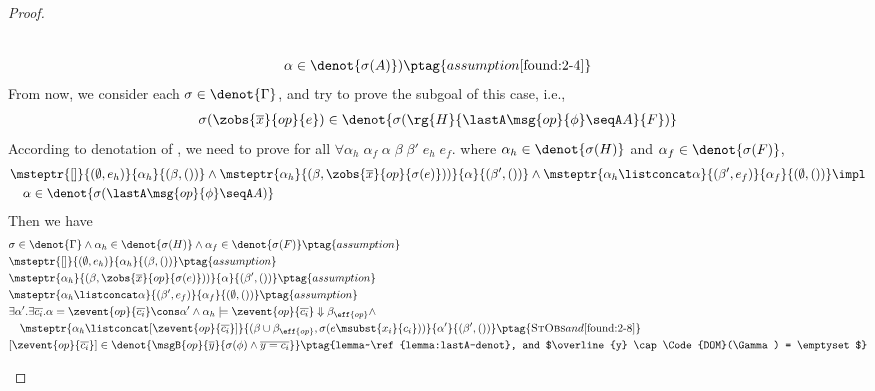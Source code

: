 \begin{proof}
\begin{enumerate}[label=Case]
{\begin{alignat}{2}
\\&\quad \alpha \in\denot{\sigma(A)}) \ptag{assumption \ref{found:2-4}} \label{found:2-5}
\end{alignat}}\noindent
From now, we consider each $\sigma \in \denot{\Gamma}$, and try to prove the subgoal of this case, i.e.,
{\footnotesize\begin{align*}
    \sigma(\zobs{\overline{x}}{op}{e}) \in \denot{\sigma(\rg{H}{\lastA\msg{op}{\phi} \seqA A}{F})}
\end{align*}}\noindent
According to denotation of \PAT, we need to prove for all $\forall \alpha_h\;\alpha_f\;\alpha\;\beta\;\beta'\;e_h\;e_f.$ where $\alpha_h \in \denot{\sigma(H)}$ and $\alpha_f \in \denot{\sigma(F)}$,
{\footnotesize\begin{align*}
&\msteptr{[]}{(\emptyset, e_h)}{\alpha_h}{(\beta, ())} \land \msteptr{\alpha_h}{(\beta, \zobs{\overline{x}}{op}{\sigma(e)}))}{\alpha}{(\beta', ())} \land \msteptr{\alpha_h \listconcat \alpha }{(\beta', e_f)}{\alpha_f}{(\emptyset, ())} \impl \notag
\\&\quad \alpha \in\denot{\sigma(\lastA\msg{op}{\phi} \seqA A)}
\end{align*}}\noindent
Then we have
{\footnotesize\begin{alignat}{2}
&\sigma \in \denot{\Gamma} \land \alpha_h \in \denot{\sigma(H)} \land  \alpha_f \in \denot{\sigma(F)} \ptag{assumption} \label{found:2-6}
\\& \msteptr{[]}{(\emptyset, e_h)}{\alpha_h}{(\beta, ())} \ptag{assumption} \label{found:2-7}
\\& \msteptr{\alpha_h}{(\beta, \zobs{\overline{x}}{op}{\sigma(e)}))}{\alpha}{(\beta', ())} \ptag{assumption} \label{found:2-8}
\\& \msteptr{\alpha_h \listconcat \alpha }{(\beta', e_f)}{\alpha_f}{(\emptyset, ())} \ptag{assumption} \label{found:2-9}
\\& \exists \alpha'.\exists \overline{c_i}. \alpha = \zevent{op}{\overline{c_i}} \cons \alpha' \land
\alpha_h \models \zevent{op}{\overline{c_i}} \Downarrow \beta_{\eff{op}} \land \notag
\\&\quad\msteptr{\alpha_h \listconcat [\zevent{op}{\overline{c_i}}]}{(\beta \cup \beta_{\eff{op}}, \sigma(e\msubst{x_i}{c_i}))}{\alpha'}{(\beta', ())} \ptag{\textsc{StObs} and \ref{found:2-8}} \label{found:2-10}
\\& [\zevent{op}{\overline{c_i}}] \in \denot{\msgB{op}{\overline{y}}{\sigma(\phi) \land \overline{y = c_i}}} \ptag{lemma~\ref{lemma:lastA-denot}, and $\overline{y} \cap \Code{DOM}(\Gamma) = \emptyset$} \label{found:1-11}

\end{alignat}}
\end{enumerate}
\end{proof}
